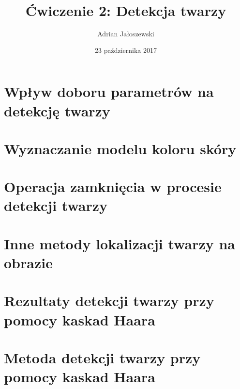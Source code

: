 \documentclass[a4paper, 12pt, titlepage]{article}
\author{Adrian Jałoszewski}
\title{Ćwiczenie 2: Detekcja twarzy}
\date{23 października 2017}
\begin{document}
    \maketitle
    \section{Wpływ doboru parametrów na detekcję twarzy}
    \section{Wyznaczanie modelu koloru skóry}
    \section{Operacja zamknięcia w procesie detekcji twarzy}
    \section{Inne metody lokalizacji twarzy na obrazie}
    \section{Rezultaty detekcji twarzy przy pomocy kaskad Haara}
    \section{Metoda detekcji twarzy przy pomocy kaskad Haara}
\end{document}
